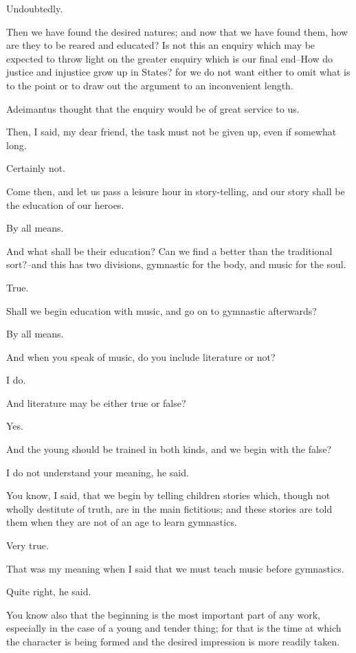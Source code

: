 Undoubtedly.

Then we have found the desired natures; and now that we have found them,
how are they to be reared and educated? Is not this an enquiry which
may be expected to throw light on the greater enquiry which is our final
end--How do justice and injustice grow up in States? for we do not want
either to omit what is to the point or to draw out the argument to an
inconvenient length.

Adeimantus thought that the enquiry would be of great service to us.

Then, I said, my dear friend, the task must not be given up, even if
somewhat long.

Certainly not.

Come then, and let us pass a leisure hour in story-telling, and our
story shall be the education of our heroes.

By all means.

And what shall be their education? Can we find a better than the
traditional sort?--and this has two divisions, gymnastic for the body,
and music for the soul.

True.

Shall we begin education with music, and go on to gymnastic afterwards?

By all means.

And when you speak of music, do you include literature or not?

I do.

And literature may be either true or false?

Yes.

And the young should be trained in both kinds, and we begin with the
false?

I do not understand your meaning, he said.

You know, I said, that we begin by telling children stories which,
though not wholly destitute of truth, are in the main fictitious;
and these stories are told them when they are not of an age to learn
gymnastics.

Very true.

That was my meaning when I said that we must teach music before
gymnastics.

Quite right, he said.

You know also that the beginning is the most important part of any work,
especially in the case of a young and tender thing; for that is the time
at which the character is being formed and the desired impression is
more readily taken.

